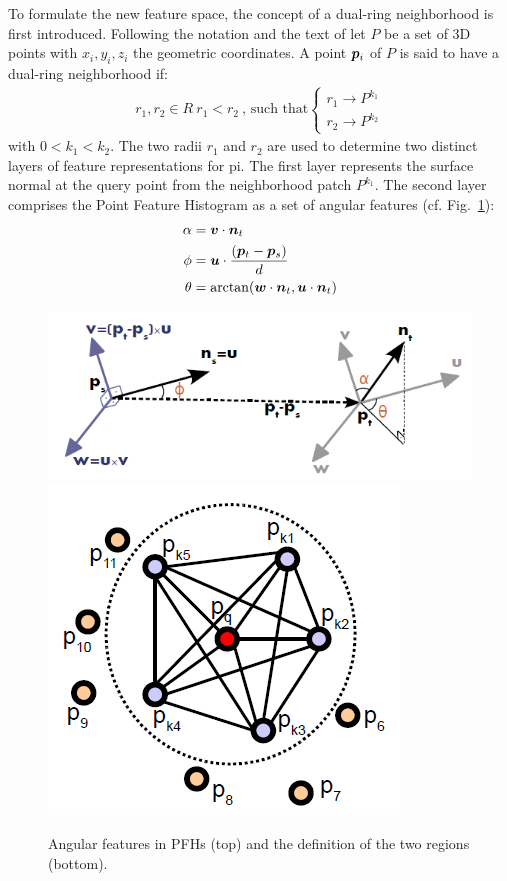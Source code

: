 \documentclass[twocolumn,oneside]{book}
\newcommand{\V}[1]{\vector{#1}}  %
\begin{document}
\begin{itemize}
  To formulate the new feature space, the concept of a dual-ring
  neighborhood is first introduced.  Following the notation and the
  text of \cite{RaduPhD} let $P$ be a set of 3D points with $x_i, y_i,
  z_i$ the geometric coordinates. A point $\V p_i$ of $P$ is said to
  have a dual-ring neighborhood if:
  \begin{align*}
  r_1, r_2 \in R \ r_1 < r_2 \
  \text{, such that}
  \left\{
  \begin{array}{l}
    r_1 \to P^{k_1}\\
    r_2 \to P^{k_2}
  \end{array}
  \right.
  \end{align*}
  with $0 < k_1 < k_2$. The two radii $r_1$ and $r_2$ are used to
  determine two distinct layers of feature representations for pi. The
  first layer represents the surface normal at the query point from
  the neighborhood patch $P^{k_1}$. The second layer comprises the
  Point Feature Histogram as a set of angular features
  (cf. Fig.~\ref{fig:angular_feature}):
  \begin{align*}
    \alpha & = \V v \cdot \V n_t \\
    \phi   & = \V u \cdot \frac{(\V p_t - \V p_s)}{d}\\
    \theta & = \arctan(\V w \cdot \V n_t, \V u \cdot \V n_t)
  \end{align*}
  \begin{figure}
    \centering
    \includegraphics[width=0.85\linewidth]{BOOKFIGS/angular_feature}
    \includegraphics[width=0.6\linewidth]{BOOKFIGS/pfh}
    \caption{Angular features in PFHs (top) and the definition of the
      two regions (bottom).}\label{fig:angular_feature}
  \end{figure}  


\end{itemize}
\end{document}

